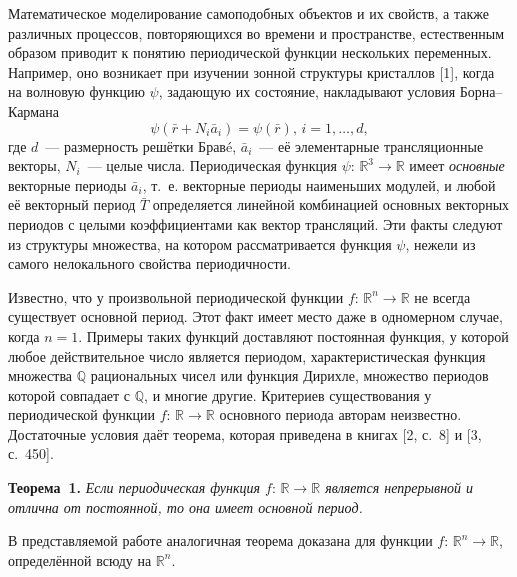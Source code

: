 





Математическое моделирование самоподобных объектов и их свойств, а также различных процессов, повторяющихся во времени и пространстве, естественным образом приводит к понятию  периодической функции нескольких переменных. Например, оно возникает при изучении  зонной структуры кристаллов [1], когда на волновую функцию
$\psi$, задающую их состояние, накладывают условия Борна--Кармана
$$
\psi(\bar{r}+N_{i}\bar{a}_{i})=\psi(\bar{r}),\,i=1,\ldots,d,
$$
где $d$~--- размерность решётки Брав{\'e},
$\bar{a}_{i}$~--- её элементарные трансляционные векторы,
$N_{i}$~--- целые числа.
Периодическая функция $\psi:\,{\mathbb R}^{3}\to{\mathbb R}$ имеет {\it основные} векторные периоды $\bar{a}_{i}$,
т.~е. векторные периоды наименьших модулей,
и любой её векторный период $\bar{T}$ определяется линейной комбинацией основных векторных периодов с целыми коэффициентами
как вектор трансляций.
Эти факты следуют из структуры множества, на котором рассматривается функция $\psi$,
нежели из самого нелокального свойства периодичности.

Известно, что у произвольной периодической функции $f:\,{\mathbb R}^{n}\to{\mathbb R}$ не всегда существует основной период. Этот факт имеет место даже в одномерном случае, когда $n=1$. Примеры таких функций  доставляют  постоянная функция, у которой любое действительное число является периодом, характеристическая функция множества ${\mathbb Q}$ рациональных чисел или функция Дирихле, множество периодов которой совпадает с ${\mathbb Q}$, и многие другие. Критериев существования у периодической функции $f:\,{\mathbb R}\to {\mathbb R}$ основного периода авторам неизвестно. Достаточные условия даёт теорема, которая приведена в книгах [2, с.~8] и [3, с.~450].

\textbf{Теорема~1.} {\it Если периодическая функция $f:\,{\mathbb R}\to {\mathbb R}$ является непрерывной и отлична от постоянной, то она имеет основной период.}

В представляемой работе аналогичная теорема доказана для функции  $f:\,{\mathbb R}^{n}\to {\mathbb R}$, определённой всюду на ${\mathbb R}^{n}$.

